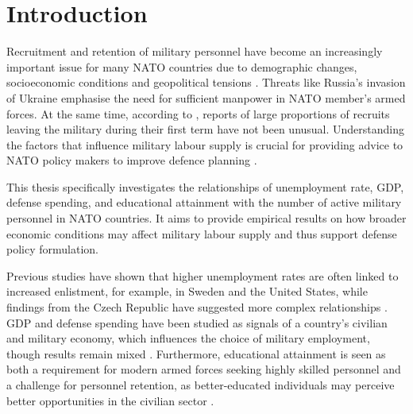 \chapter{Introduction}

Recruitment and retention of military personnel have become an increasingly 
important issue for many NATO countries due to demographic changes, socioeconomic 
conditions and geopolitical tensions \parencite{nato_research_and_technology_organization_recruiting_2007,nato_nato_2022}.
Threats like Russia's invasion of Ukraine emphasise the need for sufficient manpower in NATO member's 
armed forces. At the same time, according to \textcite{nato_research_and_technology_organization_recruiting_2007}, 
reports of large proportions of recruits leaving the military during 
their first term have not been unusual.
Understanding the factors that influence military labour supply is crucial for providing 
advice to NATO policy makers to improve defence planning \parencite{nato_research_and_technology_organization_recruiting_2007}.

This thesis specifically investigates the relationships of
unemployment rate, GDP, defense spending, and educational attainment with
the number of active military personnel in NATO countries.
It aims to provide empirical results on how broader economic conditions 
may affect military labour supply and thus support defense policy formulation.

Previous studies have shown that higher unemployment rates are often 
linked to increased enlistment, for example, in Sweden and the United States, 
while findings from the Czech Republic have suggested more complex relationships
\parencite{backstrom_are_2019,asch_cash_2010,holcner_military_2021}. 
GDP and defense spending have been studied as signals of a country's 
civilian and military economy, which influences the choice of military employment, 
though results remain mixed \parencite{warner_chapter_1995,holcner_military_2021}. 
Furthermore, educational attainment is seen as both a requirement for modern armed forces seeking highly skilled personnel 
and a challenge for personnel retention, as better-educated individuals may perceive better 
opportunities in the civilian sector
\parencite{cnas_resources_and_force_readiness_division_fiscal_nodate,hof_quality_2023}.

